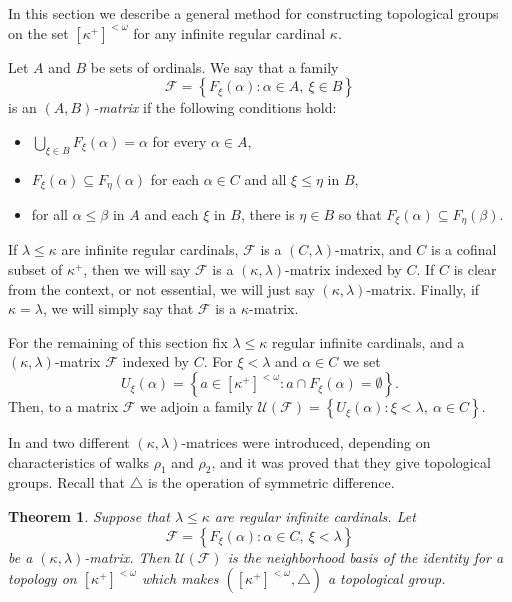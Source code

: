 \documentclass{amsart}
\theoremstyle{plain}
\newtheorem{theorem}{Theorem}[section]
\theoremstyle{definition}
\numberwithin{equation}{section}
\renewcommand{\a}{\alpha}
\renewcommand{\b}{\beta}
\renewcommand{\k}{\kappa}
\renewcommand{\o}{\omega}
\renewcommand{\l}{\lambda}
\newcommand{\ps}{\emptyset}
\newcommand{\sst}{\subseteq}
\newcommand{\cu}{\mathcal U}
\newcommand{\set}[1]{\left\{#1\right\}}
\begin{document}
In this section we describe a general method for constructing topological groups on the set $[\k^+]^{<\o}$ for any infinite regular cardinal $\k$.

Let $A$ and $B$ be sets of ordinals.
We say that a family $$\mathcal F=\set{F_{\xi}(\a): \a\in A,\ \xi\in B}$$ is an \emph{$(A,B)$-matrix} if the following conditions hold:
\begin{itemize}
	\item[(G1)] $\bigcup_{\xi\in B}F_{\xi}(\a)=\a$ for every $\a\in A$,
	\item[(G2)] $F_{\xi}(\a)\sst F_{\eta}(\a)$ for each $\a\in C$ and all $\xi\le\eta$ in $B$,
	\item[(G3)] for all $\a\le\b$ in $A$ and each $\xi$ in $B$, there is $\eta\in B$ so that $F_{\xi}(\a)\sst F_{\eta}(\b)$.
\end{itemize}

If $\l\le\k$ are infinite regular cardinals, $\mathcal F$ is a $(C,\l)$-matrix, and $C$ is a cofinal subset of $\k^+$, then we will say $\mathcal F$ is a $(\k,\l)$-matrix indexed by $C$.
If $C$ is clear from the context, or not essential, we will just say $(\k,\l)$-matrix.
Finally, if $\k=\l$, we will simply say that $\mathcal F$ is a $\k$-matrix.

For the remaining of this section fix $\l\le\k$ regular infinite cardinals, and a $(\k,\l)$-matrix $\mathcal F$ indexed by $C$. 
For $\xi<\l$ and $\a\in C$ we set $$U_{\xi}(\a)=\set{a\in [\k^+]^{<\o}: a\cap F_{\xi}(\a)=\ps}.$$
Then, to a matrix $\mathcal F$ we adjoin a family $\cu(\mathcal F)=\set{U_{\xi}(\a):\xi<\l,\ \a\in C}$. 

In \cite{pid_fund} and \cite{mt_walks} two different $(\k,\l)$-matrices were introduced, depending on characteristics of walks $\rho_1$ and $\rho_2$, and it was proved that they give topological groups.
Recall that $\triangle$ is the operation of symmetric difference.

\begin{theorem}\label{t:tgroup}
	Suppose that $\l\le\k$ are regular infinite cardinals.
	Let $$\mathcal F=\set{F_{\xi}(\a):\a\in C,\ \xi<\l}$$ be a $(\k,\l)$-matrix.
	Then $\cu(\mathcal F)$ is the neighborhood basis of the identity for a topology on $[\k^+]^{<\o}$ which makes $([\k^+]^{<\o},\triangle)$ a topological group.
\end{theorem}
\end{document}
